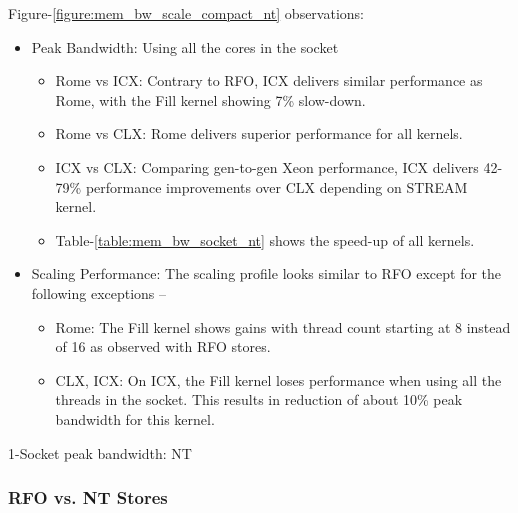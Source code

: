\documentclass{article}
\begin{document}
Figure-\ref{figure:mem_bw_scale_compact_nt} observations:
\begin{itemize}
\item Peak Bandwidth: Using all the cores in the socket
\begin{itemize}
\item Rome vs ICX: Contrary to RFO, ICX delivers similar performance as Rome, with the Fill kernel showing 7\% slow-down.
\item Rome vs CLX: Rome delivers superior performance for all kernels.
\item ICX vs CLX: Comparing gen-to-gen Xeon performance, ICX delivers 42-79\% performance improvements over CLX depending on STREAM kernel.
\item Table-\ref{table:mem_bw_socket_nt} shows the speed-up of all kernels.
\end{itemize}
\item Scaling Performance: The scaling profile looks similar to RFO except for the following exceptions --
\begin{itemize}
\item Rome: The Fill kernel shows gains with thread count starting at 8 instead of 16 as observed with RFO stores.
\item CLX, ICX: On ICX, the Fill kernel loses performance when using all the threads in the socket. This results in reduction of about 10\% peak bandwidth for this kernel.
\end{itemize}
\end{itemize}

\begin{table}[h!]
\centering

\caption{1-Socket peak bandwidth: NT}
\label{table:mem_bw_socket_nt}
\end{table}


\subsubsection{RFO vs. NT Stores}
\end{document}
